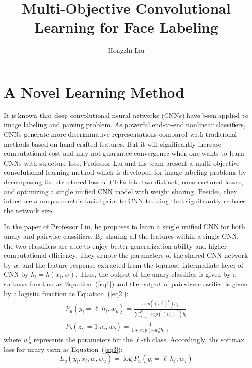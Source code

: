 \documentclass[twocolumn]{article}
\author{Hongzhi Liu}
\title{Multi-Objective Convolutional Learning for Face Labeling}
\begin{document}
	\maketitle
	\par
	\section{A Novel Learning Method}
	It is known that deep convolutional neural networks (CNNs) have been applied to image labeling and parsing problem. As powerful end-to-end nonlinear classifiers, CNNs generate more discriminative representations compared with traditional methods based on hand-crafted features. But it will significantly increase computational cost and may not guarantee convergence when one wants to learn CNNs with structure loss.
	Professor Liu and his team present a multi-objective convolutional learning method which is developed for image labeling problems \cite{Liu2015Multi} by decomposing the structured loss of CRFs \cite{Ranftl2000A} into two distinct, nonstructured losses, and optimizing a single unified CNN model with weight sharing. Besides, they introduce a nonparametric facial prior to CNN training that significantly reduces the network size.
	
	In the paper of Professor Liu, he proposes to learn a single unified CNN for both unary and pairwise classifiers. By sharing all the features within a single CNN, the two classifiers are able to enjoy better generalization ability and higher computational efficiency. They denote the parameters of the shared CNN network by $w$, and the feature response extracted from the topmost intermediate layer of CNN by $h_i=h(x_i,w)$. Thus, the output of the unary classifier is given by a softmax function as Equation~(\ref{eq1}) and the output of pairwise classifier is given by a logistic function as Equation~(\ref{eq2}):
	\begin{align}
	P_u(y_i=\ell|h_i,w_u)=\frac{exp((w_u^\ell)^T)h_i}{\sum_{\ell=1}^{K}exp((w_u^\ell)^T)h_i} \label{eq1} \\
	P_b(z_{ij}=1|h_i,w_b)=\frac{1}{1+exp(-w_b^Th_i)} \label{eq2}
	\end{align}
	where $w_u^\ell$ represents the parameters for the $\ell$-th class. Accordingly, the softmax loss for unary term as Equation~(\ref{eq3}):
	\begin{equation}
	L_u(y_i,x_i,w,w_u)=\log P_u(y_i=\ell|h_i,w_u) \label{eq3}
	\end{equation}
	
\end{document}

